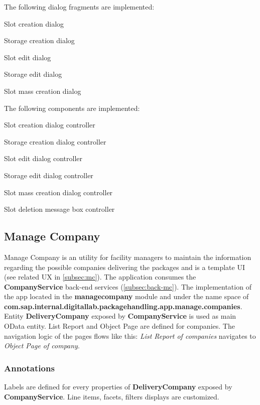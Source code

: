 \bigskip
\noindent
The following dialog fragments are implemented:
\begin{compactenum}
    \item Slot creation dialog
    \item Storage creation dialog
    \item Slot edit dialog
    \item Storage edit dialog
    \item Slot mass creation dialog
\end{compactenum}
\bigskip
\noindent
The following components are implemented:
\begin{compactenum}
    \item Slot creation dialog controller
    \item Storage creation dialog controller
    \item Slot edit dialog controller
    \item Storage edit dialog controller
    \item Slot mass creation dialog controller
    \item Slot deletion message box controller
\end{compactenum}


\subsection{Manage Company}
\label{subsec:dev-ui-mc}

Manage Company is an utility for facility managers to maintain the information regarding the possible companies delivering the packages and is a template UI (see related UX in \autoref{subsec:mc}).
The application consumes the \textbf{CompanyService} back-end services (\autoref{subsec:back-mc}).
The implementation of the app
located in the \textbf{managecompany} module and under the name space of
\textbf{com.sap.internal.digitallab.packagehandling.app.manage.companies}.
Entity \textbf{DeliveryCompany} exposed by  \textbf{CompanyService} is used as main OData entity.
List Report and Object Page are defined for companies.
The navigation logic of the pages flows like this: 
\textit{List Report of companies} navigates to \textit{Object Page of company}.

\subsubsection{Annotations}
Labels are defined for every properties of \textbf{DeliveryCompany} exposed by \textbf{CompanyService}. 
Line items, facets, filters displays are customized.

